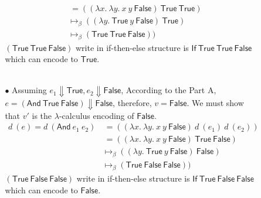 \documentclass[a4paper,answers]{exam}
\begin{document}
\begin{itemize}
\begin{solution}
\begin{itemize}[leftmargin=*]
\begin{itemize}[leftmargin=*]
\begin{align*}
                    &\ = ((\lambda x.\ \lambda y.\ x\ y\ \mathsf{False})\ \mathsf{True\ True})\\
                    & \mapsto_{\beta} ((\lambda y.\ \mathsf{True}\ y\ \mathsf{False})\ \mathsf{True})\\
                    & \mapsto_{\beta} (\mathsf{True\ True\ False}))
                \end{align*}
                $(\mathsf{True\ True\ False})$ write in if-then-else structure is $\mathsf{If\ True\ True\ False}$ which can encode to $\mathsf{True}$.\\\\
                
                \item[$\bullet$] Assuming $e_1 \Downarrow \mathsf{True}, e_2 \Downarrow \mathsf{False}$, According to the Part A, $e = (\mathsf{And\ True\ False}) \Downarrow \mathsf{False}$, therefore, $v = \mathsf{False}$.  We must show that $v'$ is the $\lambda$-calculus encoding of $\mathsf{False}$.
                \begin{align*}
                    d\ (e) = d\ (\mathsf{And}\ e_1\ e_2) &\ = ((\lambda x.\ \lambda y.\ x\ y\ \mathsf{False})\ d\ (e_1)\ d\ (e_2))\\
                    &\ = ((\lambda x.\ \lambda y.\ x\ y\ \mathsf{False})\ \mathsf{True\ False})\\
                    & \mapsto_{\beta} ((\lambda y.\ \mathsf{True}\ y\ \mathsf{False})\ \mathsf{False})\\
                    & \mapsto_{\beta} (\mathsf{True\ False\ False}))
                \end{align*}
                $(\mathsf{True\ False\ False})$ write in if-then-else structure is $\mathsf{If\ True\ False\ False}$ which can encode to $\mathsf{False}$.\\\\
            

\end{itemize}
\end{itemize}
\end{solution}
\end{itemize}
\end{document}
